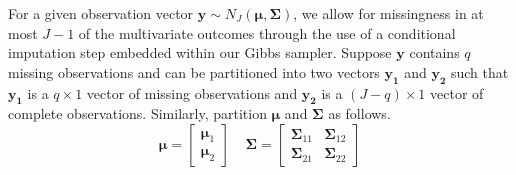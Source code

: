\documentclass[useAMS,referee]{biom}
\begin{document}
For a given observation vector $\mathbf{y} \sim N_J(\boldsymbol\mu, \boldsymbol\Sigma)$, we allow for missingness in at most $J - 1$ of the multivariate outcomes through the use of a conditional imputation step embedded within our Gibbs sampler. Suppose $\mathbf{y}$ contains $q$ missing observations and can be partitioned into two vectors $\mathbf{y_{1}}$ and $\mathbf{y_{2}}$ such that $\mathbf{y_{1}}$ is a $q \times 1$ vector of missing observations and $\mathbf{y_{2}}$ is a $(J-q) \times 1$ vector of complete observations. Similarly, partition $\boldsymbol\mu$ and $\boldsymbol\Sigma$ as follows.
$$\boldsymbol\mu = \begin{bmatrix} \boldsymbol\mu_1 \\ \boldsymbol\mu_2 \end{bmatrix} \ \ \ \ \ \boldsymbol\Sigma = \begin{bmatrix} \boldsymbol\Sigma_{11} & \boldsymbol\Sigma_{12} \\ \boldsymbol\Sigma_{21} & \boldsymbol\Sigma_{22} \end{bmatrix}$$
\end{document}
